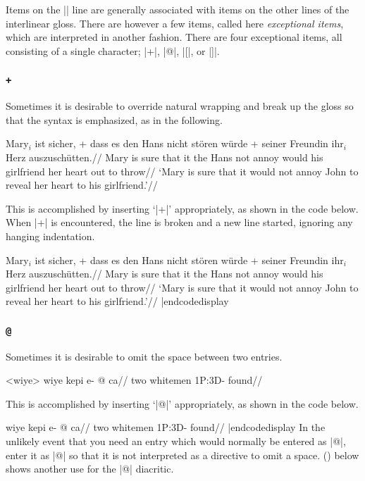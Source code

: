 Items on the |\gla| line are generally associated with items on the
other lines of the interlinear gloss.  There are however a few items,
called here {\it exceptional items}, which are interpreted in another
fashion. There are four exceptional items, all consisting of a single character;
|+|, |@|, |[|, or |]|.

\subsubsection {\tt +}

Sometimes it is desirable to override natural wrapping and
break up the gloss so that the syntax is emphasized, as in the
following.

\framedisplay
\ex
\begingl
\gla Mary$_i$ ist sicher, + dass es den Hans nicht st\"oren w\"urde
+ seiner Freundin ihr$_i$ Herz auszusch\"utten.//
\glb Mary is sure that it the Hans not annoy would
his girlfriend her heart {out to
throw}//
\glft  `Mary is sure that it would not annoy John to reveal her
heart to his girlfriend.'//
\endgl
\xe
\endframedisplay

\bigskip
This is accomplished by inserting `|+|' appropriately, as shown in the
code below.  When |+| is encountered, the line is broken and a new
line started, ignoring any hanging indentation.

\codedisplay
\ex
\begingl
\gla Mary$_i$ ist sicher, + dass es den Hans nicht st\"oren w\"urde
+ seiner Freundin ihr$_i$ Herz auszusch\"utten.//
\glb Mary is sure that it the Hans not annoy would
his girlfriend her heart {out to
throw}//
\glft  `Mary is sure that it would not annoy John to reveal her
heart to his girlfriend.'//
\endgl
\xe
|endcodedisplay

\subsubsection {\tt @}

Sometimes it is desirable to omit the space between two entries.

\framedisplay
\ex<wiye>
\begingl
\gla wiye kepi e- @ ca//
\glb two whitemen \sc1P:3D- found//
\endgl
\xe
\endframedisplay

This is accomplished by inserting `|@|' appropriately, as shown
in the code below.

\codedisplay
\ex
\begingl
\gla wiye kepi e- @ ca//
\glb two whitemen \sc1P:3D- found//
\endgl
\xe
|endcodedisplay
In the unlikely event that you need an entry which
would normally be entered as |@|, enter it as |{{@}}|
so that it is not interpreted as a directive to omit a space.
() below shows another use for the |@| diacritic.

